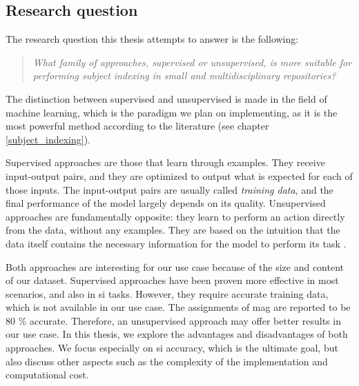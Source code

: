 \subsection{Research question} \label{problem_rq}

The research question this thesis attempts to answer is the following:

\begin{quote}
    \textit{What family of approaches, supervised or unsupervised, is more suitable for performing subject indexing in small and multidisciplinary repositories?}
\end{quote}

The distinction between supervised and unsupervised is made in the field of machine learning, which is the paradigm we plan on implementing, as it is the most powerful method according to the literature (see chapter \ref{subject_indexing}).

Supervised approaches are those that learn through examples. They receive input-output pairs, and they are optimized to output what is expected for each of those inputs. The input-output pairs are usually called \textit{training data}, and the final performance of the model largely depends on its quality. Unsupervised approaches are fundamentally opposite: they learn to perform an action directly from the data, without any examples. They are based on the intuition that the data itself contains the necessary information for the model to perform its task
\cite{hinton1999unsupervised}.

Both approaches are interesting for our use case because of the size and content of our dataset. Supervised approaches have been proven more effective in most scenarios, and also in \acrshort{si} tasks. However, they require accurate training data, which is not available in our use case. The assignments of \acrshort{mag} are reported to be 80 \% accurate. Therefore, an unsupervised approach may offer better results in our use case. In this thesis, we explore the advantages and disadvantages of both approaches. We focus especially on \acrshort{si} accuracy, which is the ultimate goal, but also discuss other aspects such as the complexity of the implementation and computational cost.